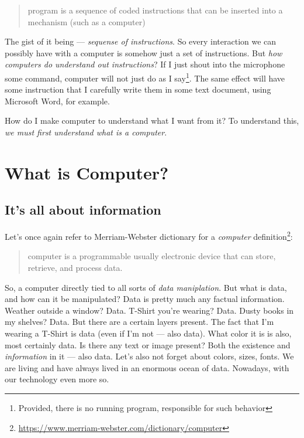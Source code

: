 \documentclass{report}
\begin{document}
        \begin{quote}
            program is a sequence of coded instructions that can be inserted into a mechanism (such as a computer)
        \end{quote}

        The gist of it being --- \emph{sequense of instructions}. So every interaction we can possibly have with a computer is somehow just a set of instructions. But \emph{how computers
        do understand out instructions}? If I just shout into the microphone some command, computer will not just do as I say\footnote{Provided, there is no running program, responsible for such behavior}.
        The same effect will have some instruction that I carefully write them in some text document, using Microsoft Word, for example. \par
        How do I make computer to understand what I want from it? To understand this, \emph{we must first understand what is a computer}. \par
        \newpage

    \chapter{What is Computer?}

        \section{It's all about information}
            Let's once again refer to Merriam-Webster dictionary for a \emph{computer} definition\footnote{\href{https://www.merriam-webster.com/dictionary/computer}{https://www.merriam-webster.com/dictionary/computer}}:

            \begin{quote}
                computer is a programmable usually electronic device that can store, retrieve, and process data.
            \end{quote}

            So, a computer directly tied to all sorts of \emph{data maniplation}. But what is data, and how can it be manipulated? Data is pretty much any factual information.
            Weather outside a window? Data. T-Shirt you're wearing? Data. Dusty books in my shelves? Data. But there are a certain layers present. The fact that I'm wearing a T-Shirt 
            is data (even if I'm not --- also data). What color it is is also, most certainly data. Is there any text or image present?
            Both the existence and \emph{information} in it --- also data. Let's also not forget about colors, sizes, fonts. We are living and have always lived in an enormous ocean of data. Nowadays, with our technology even more so. \par
            
\end{document}

